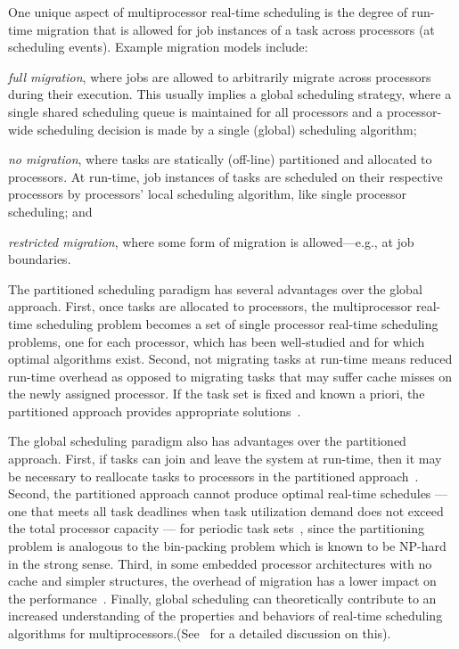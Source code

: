 \documentclass[12pt,dvips]{report}
\begin{document}
One unique aspect of multiprocessor real-time scheduling is the
degree of run-time migration that is allowed for job instances of a
task across processors (at scheduling events). Example migration
models include:
\begin{inparaenum}[(1)]
\item \textit{full migration}, where jobs are allowed to arbitrarily migrate across processors during their execution.
This usually implies a global scheduling strategy, where a single
shared scheduling queue is maintained for all processors and a
processor-wide scheduling decision is made by a single (global)
scheduling algorithm;
\item \textit{no migration}, where tasks are statically (off-line) partitioned and allocated to
processors. At run-time, job instances of tasks are scheduled on
their respective processors by processors' local scheduling
algorithm, like single processor scheduling; and
\item \textit{restricted migration}, where some form of migration is allowed---e.g., at job
boundaries.
\end{inparaenum}

The partitioned scheduling paradigm has several advantages over
the global approach. First, once tasks are allocated to
processors, the multiprocessor real-time scheduling problem
becomes a set of single processor real-time scheduling problems,
one for each processor, which has been well-studied and for which
optimal algorithms exist. Second, not migrating tasks at run-time
means reduced run-time overhead as opposed to migrating tasks that
may suffer cache misses on the newly assigned processor. If the task set is fixed and known a priori, the partitioned approach provides appropriate solutions~\cite{GEDF}.

The global scheduling paradigm also has advantages over the
partitioned approach. First, if tasks can join and leave the system
at run-time, then it may be necessary to reallocate tasks to
processors in the partitioned approach~\cite{GEDF}. Second, the
partitioned approach cannot produce optimal real-time schedules
--- one that meets all task deadlines when task utilization demand does not
exceed the total processor capacity --- for periodic task
sets~\cite{shab03}, since the partitioning problem is analogous to
the bin-packing problem which is known to be NP-hard in the strong
sense. Third, in some embedded processor architectures with no
cache and simpler structures, the overhead of migration has a
lower impact on the performance~\cite{GEDF}. Finally, global
scheduling can theoretically contribute to an increased
understanding of the properties and behaviors of real-time
scheduling algorithms for multiprocessors.(See~\cite{ha06} for a
detailed discussion on this).
\end{document}
